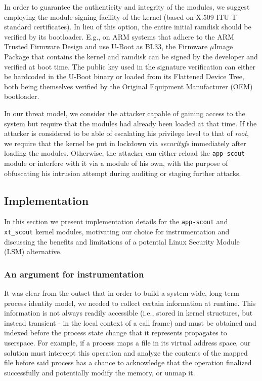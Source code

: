 In order to guarantee the authenticity and integrity of the modules, we suggest
employing the module signing facility of the kernel (based on X.509 ITU-T
standard certificates). In lieu of this option, the entire initial ramdisk
should be verified by its bootloader. E.g., on ARM systems that adhere to the
ARM Trusted Firmware Design and use U-Boot as BL33, the Firmware $\mu{}$Image
Package that contains the kernel and ramdisk can be signed by the developer and
verified at boot time. The public key used in the signature verification can
either be hardcoded in the U-Boot binary or loaded from its Flattened Device
Tree, both being themselves verified by the Original Equipment Manufacturer
(OEM) bootloader.

In our threat model, we consider the attacker capable of gaining access to the
system but require that the \scout{} modules had already been loaded at that
time. If the attacker is considered to be able of escalating his privilege level
to that of \textit{root}, we require that the kernel be put in lockdown via
\textit{securityfs} immediately after loading the \scout{} modules. Otherwise,
the attacker can either reload the \texttt{app-scout} module or interfere with
it via a module of his own, with the purpose of obfuscating his intrusion
attempt during auditing or staging further attacks.

\subsection{Implementation}
\label{apffw:appscout:implementation}

In this section we present implementation details for the \texttt{app-scout} and
\texttt{xt\_scout} kernel modules, motivating our choice for instrumentation and
discussing the benefits and limitations of a potential Linux Security Module
(LSM) alternative.


\subsubsection{An argument for instrumentation}

It was clear from the outset that in order to build a system-wide, long-term
process identity model, we needed to collect certain information at runtime.
This information is not always readily accessible (i.e., stored in kernel
structures, but instead transient - in the local context of a call frame) and
must be obtained and indexed before the process state change that it represents
propagates to userspace. For example, if a process maps a file in its virtual
address space, our solution must intercept this operation and analyze the
contents of the mapped file before said process has a chance to acknowledge that
the operation finalized successfully and potentially modify the memory, or unmap
it.

